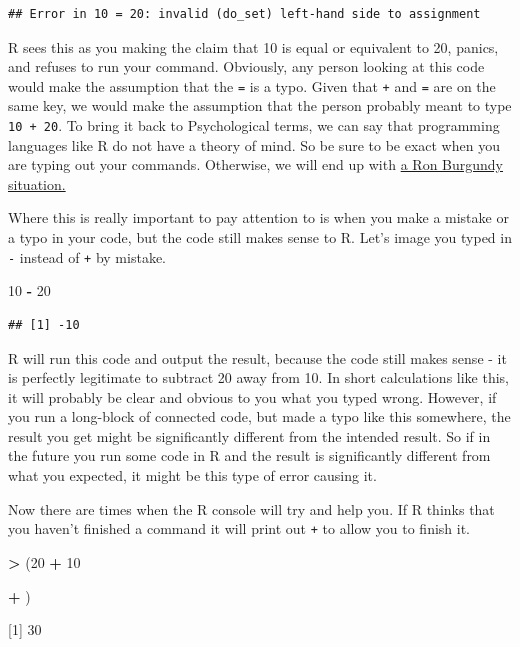\documentclass[
]{book}
\newenvironment{Shaded}{\begin{snugshade}}{\end{snugshade}}
\newcommand{\DecValTok}[1]{\textcolor[rgb]{0.00,0.00,0.81}{#1}}
\newcommand{\NormalTok}[1]{#1}
\newcommand{\SpecialCharTok}[1]{\textcolor[rgb]{0.81,0.36,0.00}{\textbf{#1}}}
\begin{document}
\begin{verbatim}
## Error in 10 = 20: invalid (do_set) left-hand side to assignment
\end{verbatim}

R sees this as you making the claim that 10 is equal or equivalent to 20, panics, and refuses to run your command. Obviously, any person looking at this code would make the assumption that the \texttt{=} is a typo. Given that \texttt{+} and \texttt{=} are on the same key, we would make the assumption that the person probably meant to type \texttt{10\ +\ 20}. To bring it back to Psychological terms, we can say that programming languages like R do not have a theory of mind. So be sure to be exact when you are typing out your commands. Otherwise, we will end up with \href{https://www.youtube.com/watch?v=X3zfP14pLxc}{a Ron Burgundy situation.}

Where this is really important to pay attention to is when you make a mistake or a typo in your code, but the code still makes sense to R. Let's image you typed in \texttt{-} instead of \texttt{+} by mistake.

\begin{Shaded}
\begin{Highlighting}[]
\DecValTok{10} \SpecialCharTok{{-}} \DecValTok{20}
\end{Highlighting}
\end{Shaded}

\begin{verbatim}
## [1] -10
\end{verbatim}

R will run this code and output the result, because the code still makes sense - it is perfectly legitimate to subtract 20 away from 10. In short calculations like this, it will probably be clear and obvious to you what you typed wrong. However, if you run a long-block of connected code, but made a typo like this somewhere, the result you get might be significantly different from the intended result. So if in the future you run some code in R and the result is significantly different from what you expected, it might be this type of error causing it.

Now there are times when the R console will try and help you. If R thinks that you haven't finished a command it will print out \texttt{+} to allow you to finish it.

\begin{Shaded}
\begin{Highlighting}[]
\SpecialCharTok{\textgreater{}}\NormalTok{ (}\DecValTok{20} \SpecialCharTok{+} \DecValTok{10}
 
\SpecialCharTok{+}\NormalTok{ )}

\NormalTok{[}\DecValTok{1}\NormalTok{] }\DecValTok{30}
\end{Highlighting}
\end{Shaded}
\end{document}
